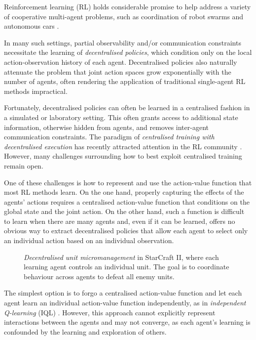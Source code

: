 \documentclass{article}
\begin{document}
Reinforcement learning (RL) holds considerable promise to help address a variety of cooperative multi-agent problems, such as coordination of robot swarms \cite{huttenrauch_guided_2017} and autonomous cars \cite{cao_overview_2012}. 

In many such settings, partial observability and/or communication constraints necessitate the learning of \textit{decentralised policies}, which condition only on the local action-observation history of each agent. Decentralised policies also naturally attenuate the problem that joint action spaces grow exponentially with the number of agents, often rendering the application of traditional single-agent RL methods impractical.

Fortunately, decentralised policies can often be learned in a centralised fashion in a simulated or laboratory setting. This often grants access to additional state information, otherwise hidden from agents, and removes inter-agent communication constraints. 
The paradigm of \textit{centralised training with decentralised execution} \cite{oliehoek_optimal_2008,kraemer_multi-agent_2016} has recently attracted attention in the RL community \cite{jorge_learning_2016,foerster_counterfactual_2017}. 
However, many challenges surrounding how to best exploit centralised training remain open.

One of these challenges is how to represent and use the action-value function that most RL methods learn.  On the one hand, properly capturing the effects of the agents' actions requires a centralised action-value function  that conditions on the global state and the joint action.  On the other hand, such a function is difficult to learn when there are many agents and, even if it can be learned, offers no obvious way to extract decentralised policies that allow each agent to select only an individual action based on an individual observation.

\begin{figure}[t!]
	\centering
	\caption{\textit{Decentralised unit micromanagement} in StarCraft II, where each learning agent controls an individual unit. The goal is to coordinate behaviour across agents to defeat all enemy units.}
	\label{fig:starcraft_screenshots}
\end{figure}

The simplest option is to forgo a centralised action-value function and let each agent  learn an individual action-value function  independently, as in \emph{independent Q-learning} (IQL) \cite{tan_multi-agent_1993}.  However, this approach cannot explicitly represent interactions between the agents and may not converge, as each agent's learning is confounded by the learning and exploration of others.
\end{document}
